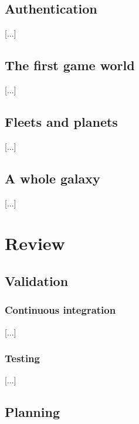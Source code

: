 \documentclass[a4paper,11pt,titlepage,abstract,numbers=noenddot,automark,mnsy,intlimits,rgb,dvipsnames]{report}
\begin{document}
\chapter{Authentication}
[...]
\chapter{The first game world}
[...]
\chapter{Fleets and planets}
[...]
\chapter{A whole galaxy}
[...]
\part{Review}
\chapter{Validation}
\label{validation}
\section{Continuous integration}
[...]
\section{Testing}
[...]
\clearpage
\chapter{Planning}
\end{document}
